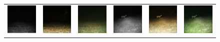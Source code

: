 \begin{figure}
\begin{tabularx}{\textwidth}{Y Y Y !{\space} Y Y Y}
        \includegraphics{gfx/conditional-diffusion-sampling-qual/nir_S2_B06_R3_PICT3848.jpg} & \includegraphics{gfx/conditional-diffusion-sampling-qual/cyclegan_S2_B06_R3_PICT3848_fake.png} & \includegraphics{gfx/conditional-diffusion-sampling-qual/diffusion_S2_B06_R3_PICT3848.png} & \includegraphics{gfx/conditional-diffusion-sampling-qual/nir_S2_B07_R1_PICT3274.jpg} & \includegraphics{gfx/conditional-diffusion-sampling-qual/cyclegan_S2_B07_R1_PICT3274_fake.png} & \includegraphics{gfx/conditional-diffusion-sampling-qual/diffusion_S2_B07_R1_PICT3274.png}

\end{tabularx}
\end{figure}
